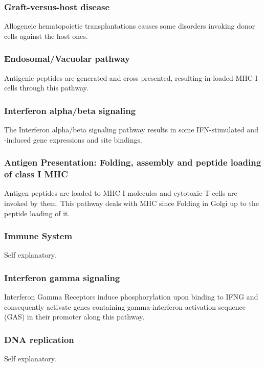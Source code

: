 \documentclass[3p,authoryear,preprint,12pt]{elsarticle}
\begin{document}
\subsubsection{Graft-versus-host disease}
Allogeneic hematopoietic transplantations causes some disorders invoking donor cells against the host ones. %

\subsubsection{Endosomal/Vacuolar pathway}
Antigenic peptides are generated and cross presented, resulting in loaded MHC-I cells through this pathway. %

\subsubsection{Interferon alpha/beta signaling}
The Interferon alpha/beta signaling pathway results in some IFN-stimulated and -induced gene expressions and site bindings.

\subsubsection{Antigen Presentation: Folding, assembly and peptide loading of class I MHC}
Antigen peptides are loaded to MHC I molecules and cytotoxic T cells are invoked by them. This pathway deals with MHC since Folding in Golgi up to the peptide loading of it.

\subsubsection{Immune System}
Self explanatory.

\subsubsection{Interferon gamma signaling}
Interferon Gamma Receptors induce phosphorylation upon binding to IFNG and consequently activate genes containing gamma-interferon activation sequence (GAS) in their promoter along this pathway. %

\subsubsection{DNA replication}
Self explanatory.
\end{document}
